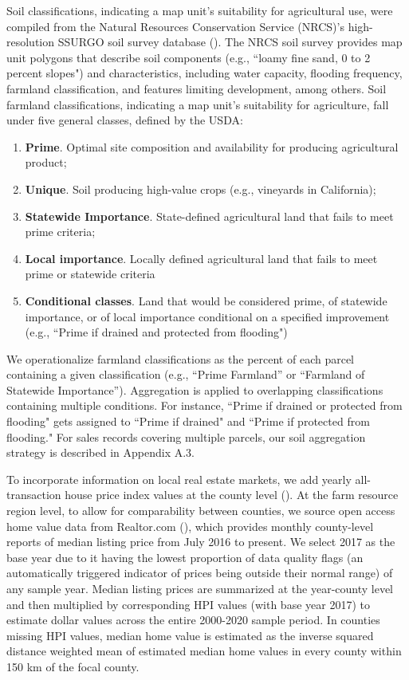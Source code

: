 \documentclass[12pt]{article}
\begin{document}
Soil classifications, indicating a map unit's suitability for agricultural use, were compiled from the Natural Resources Conservation Service (NRCS)’s high-resolution SSURGO soil survey database (\cite{SoilSurveyStaffSoilStates}). The NRCS soil survey provides map unit polygons that describe soil components (e.g., ``loamy fine sand, 0 to 2 percent slopes") and characteristics, including water capacity, flooding frequency, farmland classification, and features limiting development, among others. Soil farmland classifications, indicating a map unit's suitability for agriculture, fall under five general classes, defined by the USDA:
\begin{enumerate}
    \item \textbf{Prime}. Optimal site composition and availability for producing agricultural product;  
    \item \textbf{Unique}. Soil producing high-value crops (e.g., vineyards in California); 
    \item \textbf{Statewide Importance}. State-defined agricultural land that fails to meet prime criteria;
    \item \textbf{Local importance}. Locally defined agricultural land that fails to meet prime or statewide criteria
    \item \textbf{Conditional classes}. Land that would be considered prime, of statewide importance, or of local importance conditional on a specified improvement (e.g., ``Prime if drained and protected from flooding")
\end{enumerate}

We operationalize farmland classifications as the percent of each parcel containing a given classification (e.g., ``Prime Farmland” or ``Farmland of Statewide Importance”). Aggregation is applied to overlapping classifications containing multiple conditions. For instance, ``Prime if drained or protected from flooding" gets assigned to ``Prime if drained" and ``Prime if protected from flooding." For sales records covering multiple parcels, our soil aggregation strategy is described in Appendix A.3. 

To incorporate information on local real estate markets, we add yearly all-transaction house price index values at the county level (\cite{FederalHousing2022}). At the farm resource region level, to allow for comparability between counties, we source open access home value data from Realtor.com (\cite{RealtorData}), which provides monthly county-level reports of median listing price from July 2016 to present. We select 2017 as the base year due to it having the lowest proportion of data quality flags (an automatically triggered indicator of prices being outside their normal range) of any sample year. Median listing prices are summarized at the year-county level and then multiplied by corresponding HPI values (with base year 2017) to estimate dollar values across the entire 2000-2020 sample period. In counties missing HPI values, median home value is estimated as the inverse squared distance weighted mean of estimated median home values in every county within 150 km of the focal county. 
\end{document}
